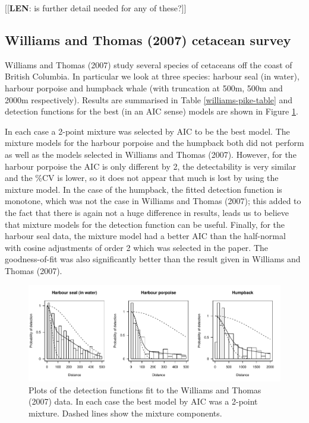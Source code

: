 \documentclass[useAMS,referee]{biom}
\begin{document}
[[\textbf{LEN}: is further detail needed for any of these?]]

\subsection{Williams and Thomas (2007) cetacean survey}

Williams and Thomas (2007) study several species of cetaceans off the coast of British Columbia. In particular we look at three species: harbour seal (in water), harbour porpoise and humpback whale (with truncation at 500m, 500m and 2000m respectively). Results are summarised in Table \ref{williams-pike-table} and detection functions for the best (in an AIC sense) models are shown in Figure \ref{williams-detfcts}.

In each case a 2-point mixture was selected by AIC to be the best model. The mixture models for the harbour porpoise and the humpback both did not perform as well as the models selected in Williams and Thomas (2007). However, for the harbour porpoise the AIC is only different by 2, the detectability is very similar and the \%CV is lower, so it does not appear that much is lost by using the mixture model. In the case of the humpback, the fitted detection function is monotone, which was not the case in Williams and Thomas (2007); this added to the fact that there is again not a huge difference in results, leads us to believe that mixture models for the detection function can be useful. Finally, for the harbour seal data, the mixture model had a better AIC than the half-normal with cosine adjustments of order 2 which was selected in the paper. The goodness-of-fit was also significantly better than the result given in Williams and Thomas (2007).

\begin{figure}
\centering
\includegraphics[width=\textwidth]{analyses/williamsplots.pdf}
\caption{Plots of the detection functions fit to the Williams and Thomas (2007) data. In each case the best model by AIC was a 2-point mixture. Dashed lines show the mixture components.}
\label{williams-detfcts}
\end{figure}
\end{document}
